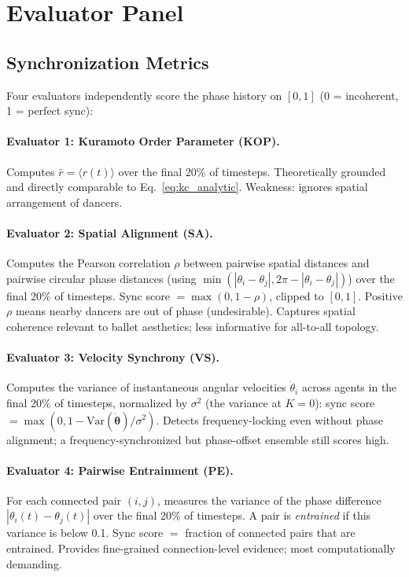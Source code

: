 \documentclass[11pt]{article}
\begin{document}
\section{Evaluator Panel}

\subsection{Synchronization Metrics}

Four evaluators independently score the phase history on $[0, 1]$ (0 = incoherent,
1 = perfect sync):

\paragraph{Evaluator 1: Kuramoto Order Parameter (KOP).}
Computes $\bar{r} = \langle r(t) \rangle$ over the final 20\% of timesteps.
Theoretically grounded and directly comparable to Eq.~\eqref{eq:kc_analytic}.
Weakness: ignores spatial arrangement of dancers.

\paragraph{Evaluator 2: Spatial Alignment (SA).}
Computes the Pearson correlation $\rho$ between pairwise spatial distances and pairwise
circular phase distances (using $\min(|\theta_i - \theta_j|, 2\pi - |\theta_i - \theta_j|)$)
over the final 20\% of timesteps. Sync score $= \max(0, 1 - \rho)$, clipped to $[0,1]$.
Positive $\rho$ means nearby dancers are out of phase (undesirable). Captures spatial
coherence relevant to ballet aesthetics; less informative for all-to-all topology.

\paragraph{Evaluator 3: Velocity Synchrony (VS).}
Computes the variance of instantaneous angular velocities $\dot{\theta}_i$ across
agents in the final 20\% of timesteps, normalized by $\sigma^2$ (the variance at
$K = 0$): sync score $= \max(0, 1 - \text{Var}(\dot{\boldsymbol{\theta}}) / \sigma^2)$.
Detects frequency-locking even without phase alignment; a frequency-synchronized but
phase-offset ensemble still scores high.

\paragraph{Evaluator 4: Pairwise Entrainment (PE).}
For each connected pair $(i, j)$, measures the variance of the phase difference
$|\theta_i(t) - \theta_j(t)|$ over the final 20\% of timesteps. A pair is
\emph{entrained} if this variance is below 0.1. Sync score $=$ fraction of connected
pairs that are entrained. Provides fine-grained connection-level evidence; most
computationally demanding.
\end{document}
